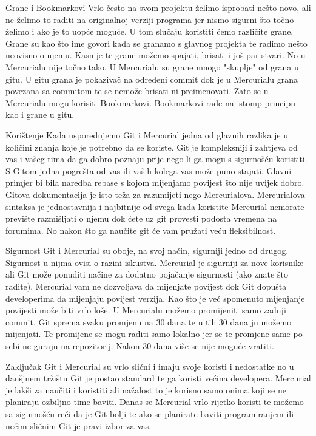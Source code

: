 \documentclass{beamer}
\begin{document}
\begin{frame}{Grane i Bookmarkovi}
Vrlo često na svom projektu želimo isprobati nešto novo, ali ne želimo to raditi na originalnoj verziji programa jer nismo sigurni što točno želimo i ako je to uopće moguće. U tom slučaju koristiti ćemo različite grane. Grane su kao što ime govori kada se granamo s glavnog projekta te radimo nešto neovisno o njemu. Kasnije te grane možemo spajati, brisati i još par stvari. No u Mercurialu nije točno tako. U Mercurialu su grane mnogo "skuplje" od grana u gitu. U gitu grana je pokazivač na određeni commit dok je u Mercurialu grana povezana sa commitom te se nemože brisati ni preimenovati. Zato se u Mercurialu mogu korisiti Bookmarkovi. Bookmarkovi rade na istomp principu kao i grane u gitu.
\end{frame}
\begin{frame}{Korištenje}
Kada uspoređujemo Git i Mercurial jedna od glavnih razlika je u količini znanja koje je potrebno da se koriste. Git je kompleksniji i zahtjeva od vas i vašeg tima da ga dobro poznaju prije nego li ga mogu s sigurnošću koristiti. S Gitom jedna pogrešta od vas ili vaših kolega vas može puno stajati. Glavni primjer bi bila naredba rebase s kojom mijenjamo povijest što nije uvijek dobro. Gitova dokumentacija je isto teža za razumijeti nego Mercurialova. Mercurialova sintaksa je jednostavnija i najbitnije od svega kada koristite Mercurial nemorate prevište razmišljati o njemu dok ćete uz git provesti podosta vremena na forumima. No nakon što ga naučite git će vam pružati veću fleksibilnost.
\end{frame}
\begin{frame}{Sigurnost}
Git i Mercurial su oboje, na svoj način, sigurniji jedno od drugog. Sigurnost u nijma ovisi o razini iskustva. Mercurial je sigurniji za nove korisnike ali Git može ponuditi načine za dodatno pojačanje sigurnosti (ako znate što radite). Mercurial vam ne dozvoljava da mijenjate povijest dok Git dopušta developerima da mijenjaju povijest verzija. Kao što je već spomenuto mijenjanje povijesti može biti vrlo loše. U Mercurialu možemo promijeniti samo zadnji commit. Git sprema svaku promjenu na 30 dana te u tih 30 dana ju možemo mijenjati. Te promijene se mogu raditi samo lokalno jer se te promjene same po sebi ne guraju na repozitorij. Nakon 30 dana više se nije moguće vratiti.
\end{frame}
\begin{frame}{Zaključak}
Git i Mercurial su vrlo slični i imaju svoje koristi i nedostatke no u danšjnem tržištu Git je postao standard te ga koristi većina developera. Mercurial je lakši za naučiti i koristiti ali nažalost to je korisno samo onima koji se ne planiraju ozbiljno time baviti. Danas se Mercurial vrlo rijetko koristi te možemo sa sigurnošću reći da je Git bolji te ako se planirate baviti programiranjem ili nečim sličnim Git je pravi izbor za vas.
\end{frame}
\end{document}
